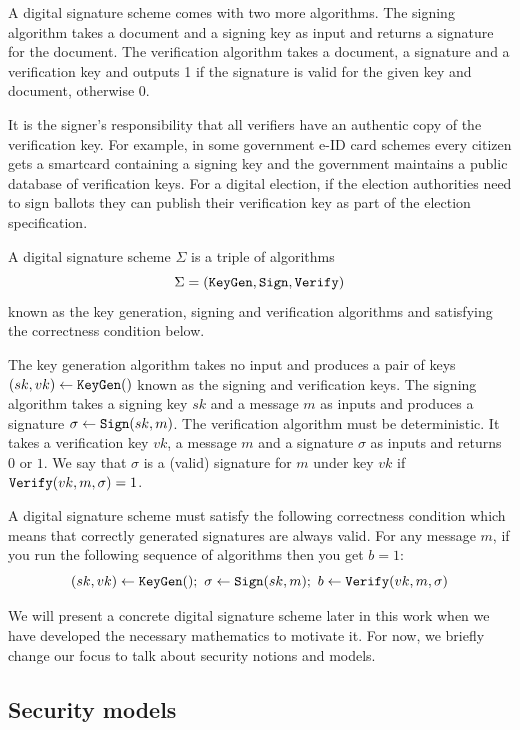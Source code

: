 \documentclass[envcountsame]{llncs}
\newcommand{\alg}[1]{\textup{\texttt{#1}}}
\begin{document}
A digital signature scheme comes with two more algorithms. The signing algorithm
takes a document and a signing key as input and returns a signature for the
document. The verification algorithm takes a document, a signature and a
verification key and outputs 1 if the signature is valid for the given key and
document, otherwise 0.

It is the signer's responsibility that all verifiers have an authentic copy of
the verification key. For example, in some government e-ID card schemes every
citizen gets a smartcard containing a signing key and the government maintains a
public database of verification keys. For a digital election, if the election
authorities need to sign ballots they can publish their verification key as part
of the election specification.

\begin{definition}
A digital signature scheme $\Sigma$ is a triple of algorithms
\[
\Sigma = \left( \alg{KeyGen}, \alg{Sign}, \alg{Verify} \right)
\]
known as the key generation, signing and verification algorithms and satisfying
the correctness condition below.

The key generation algorithm takes no input and produces a pair of keys $(sk,
vk) \gets \alg{KeyGen}()$ known as the signing and verification keys. The
signing algorithm takes a signing key $sk$ and a message $m$ as inputs and
produces a signature $\sigma \gets \alg{Sign}(sk, m)$. The verification
algorithm must be deterministic. It takes a verification key $vk$, a message $m$
and a signature $\sigma$ as inputs and returns $0$ or $1$. We say that $\sigma$
is a (valid) signature for $m$ under key $vk$ if $\alg{Verify}(vk, m, \sigma) =
1$.

A digital signature scheme must satisfy the following correctness condition
which means that correctly generated signatures are always valid. For any
message $m$, if you run the following sequence of algorithms then you get $b =
1$:
\[
(sk, vk) \gets \alg{KeyGen}();\ \sigma \gets \alg{Sign}(sk, m);\ b \gets \alg{Verify}(vk, m, \sigma)
\]
\end{definition}

We will present a concrete digital signature scheme later in this work when we
have developed the necessary mathematics to motivate it. For now, we briefly
change our focus to talk about security notions and models.

\subsection{Security models}
\end{document}
